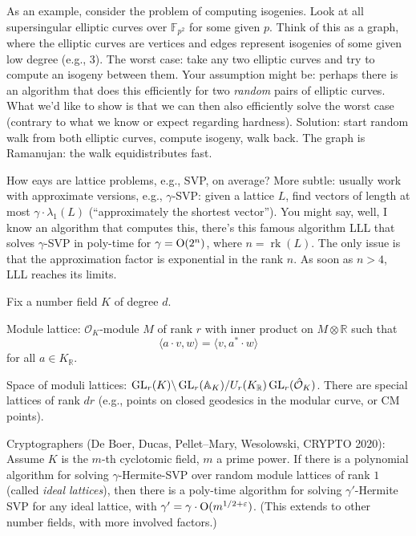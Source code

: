 \documentclass[reqno]{amsart} 
\numberwithin{theorem}{section}
\numberwithin{equation}{section}
\begin{document}
As an example, consider the problem of computing isogenies.  Look at all supersingular elliptic curves over $\mathbb{F}_{p^2}$ for some given $p$.  Think of this as a graph, where the elliptic curves are vertices and edges represent isogenies of some given low degree (e.g., $3$).  The worst case: take any two elliptic curves and try to compute an isogeny between them.  Your assumption might be: perhaps there is an algorithm that does this efficiently for two \emph{random} pairs of elliptic curves.  What we'd like to show is that we can then also efficiently solve the worst case (contrary to what we know or expect regarding hardness).  Solution: start random walk from both elliptic curves, compute isogeny, walk back.  The graph is Ramanujan: the walk equidistributes fast.

How eays are lattice problems, e.g., SVP, on average?  More subtle: usually work with approximate versions, e.g., $\gamma$-SVP: given a lattice $L$, find vectors of length at most $\gamma \cdot \lambda_1(L)$ (``approximately the shortest vector'').  You might say, well, I know an algorithm that computes this, there's this famous algorithm LLL that solves $\gamma$-SVP in poly-time for $\gamma = \operatorname{O}(2^n)$, where $n = \operatorname{rk}(L)$.  The only issue is that the approximation factor is exponential in the rank $n$.
As soon as $n > 4$, LLL reaches its limits.

Fix a number field $K$ of degree $d$.

Module lattice: $\mathcal{O}_K$-module $M$ of rank $r$ with inner product on $M \otimes \mathbb{R}$ such that
\begin{equation*}
  \langle a \cdot v, w \rangle = \langle v, a^\ast \cdot w \rangle
\end{equation*}
for all $a \in K_{\mathbb{R}}$.

Space of moduli lattices: $\operatorname{GL}_r(K) \backslash \operatorname{GL}_r(\mathbb{A}_K) / U_r(K_{\mathbb{R}} ) \operatorname{GL}_r(\hat{\mathcal{O}}_K)$.  There are special lattices of rank $d r$ (e.g., points on closed geodesics in the modular curve, or CM points).

Cryptographers (De Boer, Ducas, Pellet--Mary, Wesolowski, CRYPTO 2020): Assume $K$ is the $m$-th cyclotomic field, $m$ a prime power.  If there is a polynomial algorithm for solving $\gamma$-Hermite-SVP over random module lattices of rank $1$ (called \emph{ideal lattices}), then there is a poly-time algorithm for solving $\gamma '$-Hermite SVP for any ideal lattice, with $\gamma ' = \gamma \cdot \operatorname{O}(m^{1/2 + \varepsilon})$.  (This extends to other number fields, with more involved factors.)
\end{document}
